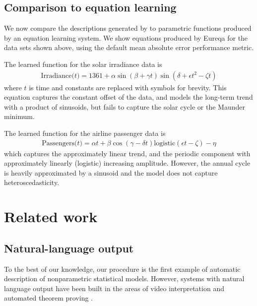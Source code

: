 \subsection{Comparison to equation learning}
\label{sec:eqn-learning-comp}

We now compare the descriptions generated by \procedurename{} to parametric functions produced by an equation learning system.
We show equations produced by Eureqa \citep{Eureqa} for the data sets shown above, using the default mean absolute error performance metric.

The learned function for the solar irradiance data is
\begin{align*}
\textrm{Irradiance($t$)} = 1361 + \alpha\sin(\beta + \gamma t)\sin(\delta + \epsilon t^2 - \zeta t)
\end{align*}
where $t$ is time and constants are replaced with symbols for brevity.
This equation captures the constant offset of the data, and models the long-term trend with a product of sinusoids, but fails to capture the solar cycle or the Maunder minimum.

The learned function for the airline passenger data is
\begin{align*}
\textrm{Passengers($t$)} = \alpha t + \beta\cos(\gamma - \delta t)\textrm{logistic}(\epsilon t - \zeta) - \eta
\end{align*}
which captures the approximately linear trend, and the periodic component with approximately linearly (logistic) increasing amplitude.
However, the annual cycle is heavily approximated by a sinusoid and the model does not capture heteroscedasticity.






\section{Related work}
\label{sec:related-work}


\subsection{Natural-language output}
To the best of our knowledge, our procedure is the first example of automatic description of nonparametric statistical models.
However, systems with natural language output have been built in the areas of video interpretation \citep{barbu2012video} and automated theorem proving \citep{GanesalingamG13}.





